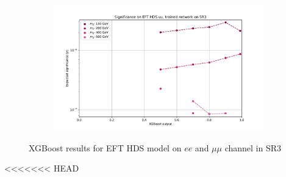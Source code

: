 \documentclass[12pt, a4paper]{book}
\begin{document}
\begin{figure}[!ht]
\begin{subfigure}[b]{0.49\textwidth}
   \end{subfigure}
   \hfill
   \begin{subfigure}[b]{0.49\textwidth}
      \centering
      \includegraphics[width=1\textwidth]{XGBoost/Model_independent/150/EFT_HDS/EXP_SIG_uu.pdf}
   \end{subfigure}
   \caption{XGBoost results for EFT HDS model on $ee$ and $\mu\mu$ channel in SR3}\label{fig:EFT_HDS_SR3}
\end{figure}
<<<<<<< HEAD
\end{document}
